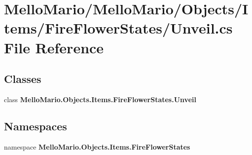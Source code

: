 \section{Mello\+Mario/\+Mello\+Mario/\+Objects/\+Items/\+Fire\+Flower\+States/\+Unveil.cs File Reference}
\label{FireFlowerStates_2Unveil_8cs}
\subsection*{Classes}
\begin{DoxyCompactItemize}
\item 
class \textbf{ Mello\+Mario.\+Objects.\+Items.\+Fire\+Flower\+States.\+Unveil}
\end{DoxyCompactItemize}
\subsection*{Namespaces}
\begin{DoxyCompactItemize}
\item 
namespace \textbf{ Mello\+Mario.\+Objects.\+Items.\+Fire\+Flower\+States}
\end{DoxyCompactItemize}
